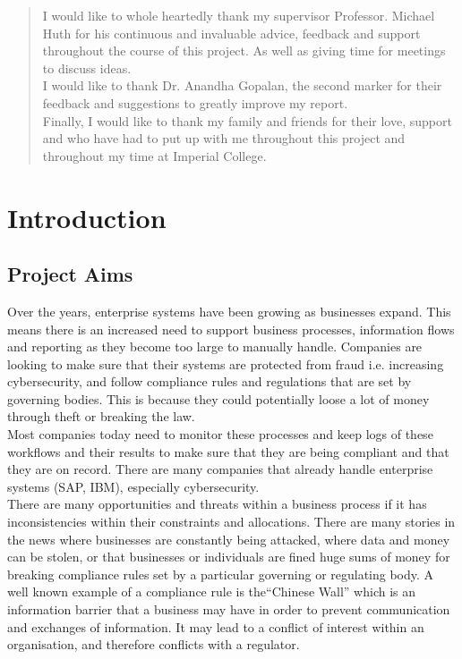 \documentclass[a4paper]{report}
\begin{document}
\renewcommand{\abstractname}{Acknowledgements}
\begin{abstract}
I would like to whole heartedly thank my supervisor Professor. Michael Huth for his continuous and invaluable advice, feedback and support throughout the course of this project. As well as giving time for meetings to discuss ideas. \\

I would like to thank Dr. Anandha Gopalan, the second marker for their feedback and suggestions to greatly improve my report. \\

Finally, I would like to thank my family and friends for their love, support and who have had to put up with me throughout this project and throughout my time at Imperial College.  
\end{abstract}

\tableofcontents

\chapter{Introduction}
\section{Project Aims}
Over the years, enterprise systems have been growing as businesses expand. This means there is an increased need to support business processes, information flows and reporting as they become too large to manually handle. Companies are looking to make sure that their systems are protected from fraud i.e. increasing cybersecurity, and follow compliance rules and regulations that are set by governing bodies. This is because they could potentially loose a lot of money through theft or breaking the law. \\

Most companies today need to monitor these processes and keep logs of these workflows and their results to make sure that they are being compliant and that they are on record. There are many companies that already handle enterprise systems (SAP, IBM), especially cybersecurity. \\

There are many opportunities and threats within a business process if it has inconsistencies within their constraints and allocations. There are many stories in the news where businesses are constantly being attacked, where data and money can be stolen, or that businesses or individuals are fined huge sums of money for breaking compliance rules set by a particular governing or regulating body. A well known example of a compliance rule is the``Chinese Wall''\cite{ChineseWall} which is an information barrier that a business may have in order to prevent communication and exchanges of information. It may lead to a conflict of interest within an organisation, and therefore conflicts with a regulator.\\
\end{document}
